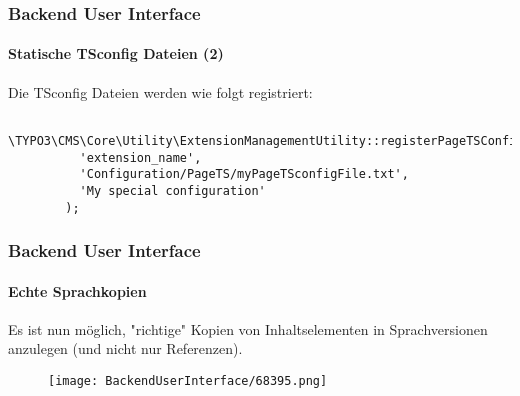 \begin{frame}[fragile]
	\frametitle{Backend User Interface}
	\framesubtitle{Statische TSconfig Dateien (2)}

	\lstset{basicstyle=\tiny\ttfamily}

	Die TSconfig Dateien werden wie folgt registriert:

	\begin{lstlisting}
		\TYPO3\CMS\Core\Utility\ExtensionManagementUtility::registerPageTSConfigFile(
		  'extension_name',
		  'Configuration/PageTS/myPageTSconfigFile.txt',
		  'My special configuration'
		);
	\end{lstlisting}

\end{frame}

\begin{frame}[fragile]
	\frametitle{Backend User Interface}
	\framesubtitle{Echte Sprachkopien}

	Es ist nun möglich, "richtige" Kopien von Inhaltselementen in Sprachversionen anzulegen
	(und nicht nur Referenzen).

	\begin{figure}
		\texttt{[image: BackendUserInterface/68395.png]}
	\end{figure}

\end{frame}


